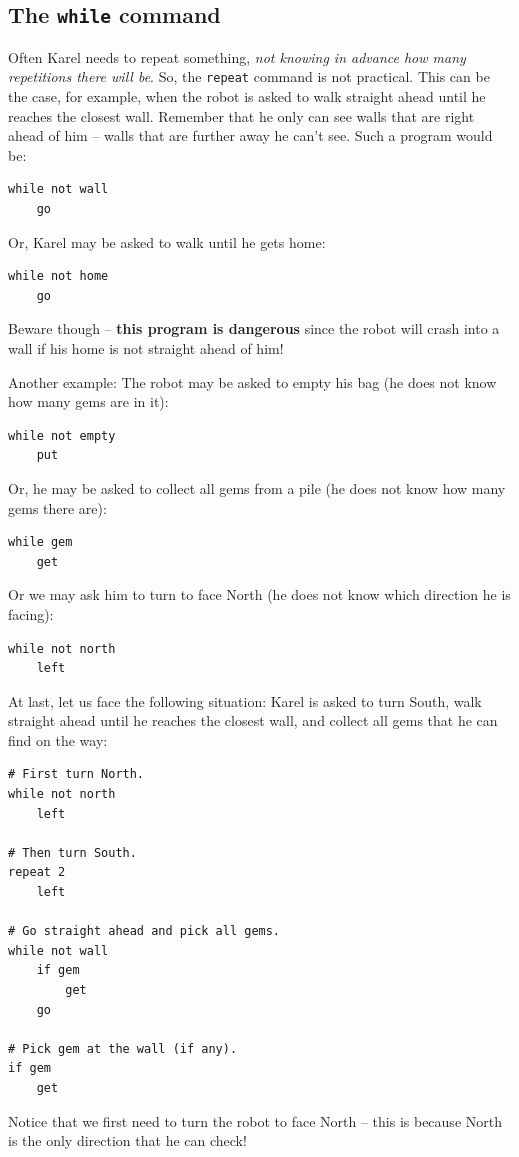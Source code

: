 {{{{\subsection{The {\tt while} command}

Often Karel needs to repeat something, {\em not knowing in advance how many repetitions
there will be}. So, the {\tt repeat} command is not practical. This can be the case, for example, 
when the robot is asked to walk straight ahead until he reaches the closest wall.
Remember that he only can see walls that are right ahead of him -- walls 
that are further away he can't see. Such a program would be:

\begin{verbatim}
while not wall
    go
\end{verbatim}
Or, Karel may be asked to walk until he gets home:

\begin{verbatim}
while not home
    go
\end{verbatim}
Beware though -- {\bf this program is dangerous} since the robot will crash into a wall
if his home is not straight ahead of him!

Another example: The robot may be asked to empty his bag (he does not know how many gems are in it): 
 
\begin{verbatim}
while not empty
    put
\end{verbatim}
Or, he may be asked to collect all gems from a pile (he does not know 
how many gems there are):

\begin{verbatim}
while gem
    get
\end{verbatim}
Or we may ask him to turn to face North (he does not know which direction he is
facing):

\begin{verbatim}
while not north
    left
\end{verbatim}
At last, let us face the following situation: Karel is asked to 
turn South, walk straight ahead until he reaches the closest wall, and 
collect all gems that he can find on the way:

\begin{verbatim}
# First turn North.
while not north
    left

# Then turn South.
repeat 2
    left

# Go straight ahead and pick all gems.
while not wall
    if gem
        get
    go

# Pick gem at the wall (if any).
if gem
    get
\end{verbatim}
Notice that we first need to turn the robot to face North -- this is because North 
is the only direction that he can check!

}}}}
